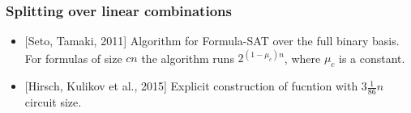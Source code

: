 \begin{frame}
    \frametitle{Splitting over linear combinations}

	\begin{itemize}
		\item{} [Seto, Tamaki, 2011] Algorithm for Formula-SAT over the full binary
		    basis. For formulas of size $cn$ the algorithm runs $2^{(1 - \mu_c)n}$,
            where $\mu_c$ is a constant.
        \pause
		\item{} [Hirsch, Kulikov et al., 2015] Explicit construction of fucntion with $3 \frac{1}{86}n$ circuit size.
	\end{itemize}    
\end{frame}